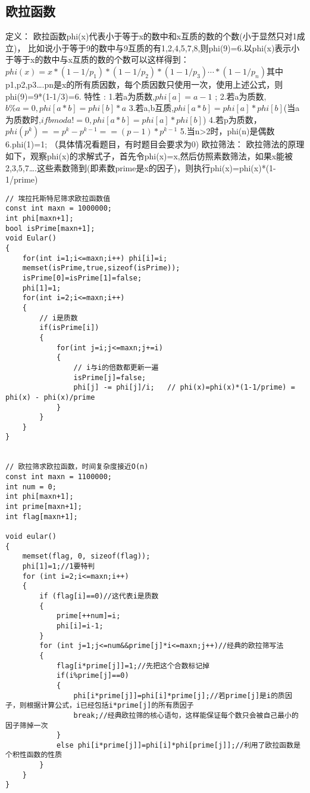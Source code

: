 \subsection{欧拉函数}
定义：
欧拉函数phi(x)代表小于等于x的数中和x互质的数的个数(小于显然只对1成立)， 比如说小于等于9的数中与9互质的有1,2,4,5,7,8,则phi(9)=6.以phi(x)表示小于等于x的数中与x互质的数的个数可以这样得到：$ phi(x)=x\ast(1-1/p_1)\ast(1-1/p_2)\ast(1-1/ p_3)\cdots\ast(1-1/p_n) $其中p1,p2,p3….pn是x的所有质因数，每个质因数只使用一次，使用上述公式，则phi(9)=9*(1-1/3)=6.
\newline
\newline
特性 :
1.若a为质数,$ phi[a]=a-1 $ ;
\newline
2.若a为质数,$ b \% a=0,phi[a\ast b]=phi[b]\ast a
$
\newline
3.若a,b互质,$ phi[a\ast b]=phi[a]\ast phi[b] $(当a为质数时,$ if b mod a!=0 ,phi[a\ast b]=phi[a]\ast phi[b] $)
\newline
4.若p为质数，$ phi(p^k) == p^k - p^{k-1} == (p-1)\ast p^{k-1} $
\newline
5.当n>2时，phi(n)是偶数
\newline
6.phi(1)=1; （具体情况看题目，有时题目会要求为0)
\newline
\newline
欧拉筛法：
欧拉筛法的原理如下，观察phi(x)的求解式子，首先令phi(x)=x,然后仿照素数筛法，如果x能被2,3,5,7….这些素数筛到(即素数prime是x的因子)，则执行phi(x)=phi(x)*(1-1/prime)
\newline
\newline
\begin{lstlisting}
// 埃拉托斯特尼筛求欧拉函数值
const int maxn = 1000000;
int phi[maxn+1];
bool isPrime[maxn+1];
void Eular()
{
	for(int i=1;i<=maxn;i++) phi[i]=i;
	memset(isPrime,true,sizeof(isPrime));
	isPrime[0]=isPrime[1]=false;
	phi[1]=1;
	for(int i=2;i<=maxn;i++)
	{
		// i是质数
		if(isPrime[i])
		{
			for(int j=i;j<=maxn;j+=i)
			{
				// i与i的倍数都更新一遍
				isPrime[j]=false;
				phi[j] -= phi[j]/i;   // phi(x)=phi(x)*(1-1/prime) = phi(x) - phi(x)/prime
			}
		}
	}
}


// 欧拉筛求欧拉函数，时间复杂度接近O(n)
const int maxn = 1100000;
int num = 0;
int phi[maxn+1];
int prime[maxn+1];
int flag[maxn+1];

void eular()
{
	memset(flag, 0, sizeof(flag));
	phi[1]=1;//1要特判
	for (int i=2;i<=maxn;i++)
	{
		if (flag[i]==0)//这代表i是质数
		{
			prime[++num]=i;
			phi[i]=i-1;
		}
		for (int j=1;j<=num&&prime[j]*i<=maxn;j++)//经典的欧拉筛写法
		{
			flag[i*prime[j]]=1;//先把这个合数标记掉
			if(i%prime[j]==0)
			{
				phi[i*prime[j]]=phi[i]*prime[j];//若prime[j]是i的质因子，则根据计算公式，i已经包括i*prime[j]的所有质因子
				break;//经典欧拉筛的核心语句，这样能保证每个数只会被自己最小的因子筛掉一次
			}
			else phi[i*prime[j]]=phi[i]*phi[prime[j]];//利用了欧拉函数是个积性函数的性质
		}
	}
}
\end{lstlisting}

